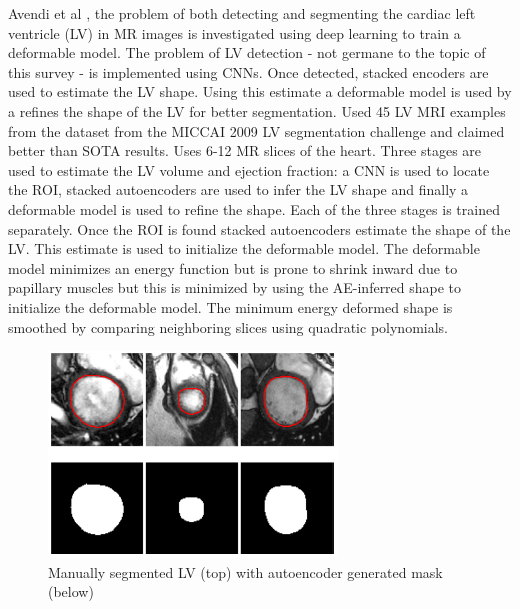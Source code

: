 \documentclass[letterpaper, 10 pt, conference]{ieeeconf}  %
\begin{document}
Avendi et al \cite{avendi_combined_2016}, the problem of both detecting and segmenting the cardiac left ventricle (LV) in MR images is investigated using deep learning to train a deformable model. The problem of LV detection - not germane to the topic of this survey - is implemented using CNNs. Once detected, stacked encoders are used to estimate the LV shape. Using this estimate a deformable model is used by a refines the shape of the LV for better segmentation. Used 45 LV MRI examples from the dataset from the MICCAI 2009 LV segmentation challenge and claimed better than SOTA results. Uses 6-12 MR slices of the heart. Three stages are used to estimate the LV volume and ejection fraction: a CNN is used to locate the ROI, stacked autoencoders are used to infer the LV shape and finally a deformable model is used to refine the shape. Each of the three stages is trained separately. Once the ROI is found stacked autoencoders estimate the shape of the LV. This estimate is used to initialize the deformable model. The deformable model minimizes an energy function but is prone to shrink inward due to papillary muscles but this is minimized by using the AE-inferred shape to initialize the deformable model. The minimum energy deformed shape is smoothed by comparing neighboring slices using quadratic polynomials. 

\begin{figure}
  \includegraphics[width=\linewidth]{images/avendi.png}
  \caption{Manually segmented LV (top) with autoencoder generated mask (below) \cite{avendi_combined_2016}}
  \label{fig:avendi.png}
\end{figure}
\end{document}
